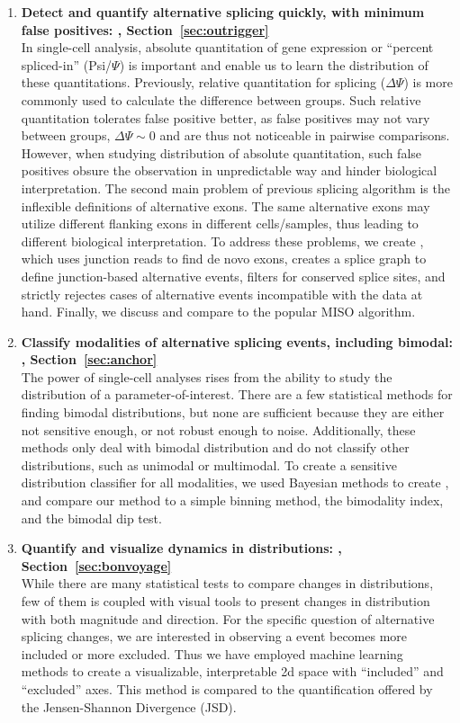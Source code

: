 \begin{enumerate}
	\item \textbf{Detect and quantify alternative splicing quickly, with minimum false positives: \outrigger, Section~\ref{sec:outrigger}}\\
	In single-cell analysis, absolute quantitation of gene expression or ``percent spliced-in'' (Psi/$\Psi$) is important and enable us to learn the distribution of these quantitations. Previously, relative quantitation for splicing ($\Delta\Psi$) is more commonly used to calculate the difference between groups. Such relative quantitation tolerates false positive better, as false positives may not vary between groups, $\Delta\Psi \sim 0$ and are thus not noticeable in pairwise comparisons. However, when studying distribution of absolute quantitation, such false positives obsure the observation in unpredictable way and hinder biological interpretation. The second main problem of previous splicing algorithm is the inflexible definitions of alternative exons. The same alternative exons may utilize different flanking exons in different cells/samples, thus leading to different biological interpretation. To address these problems, we create \outrigger, which uses junction reads to find de novo exons, creates a splice graph to define junction-based alternative events, filters for conserved splice sites, and strictly rejectes cases of alternative events incompatible with the data at hand. Finally, we discuss and compare to the popular MISO\cite{Katz:2010iv} algorithm.
	\item \textbf{Classify modalities of alternative splicing events, including bimodal: \anchor, Section~\ref{sec:anchor}}\\
	The power of single-cell analyses rises from the ability to study the distribution of a parameter-of-interest. There are a few statistical methods for finding bimodal distributions, but none are sufficient because they are either not sensitive enough, or not robust enough to noise. Additionally, these methods only deal with bimodal distribution and do not classify other distributions, such as unimodal or multimodal. To create a sensitive distribution classifier for all modalities, we used Bayesian methods to create \anchor, and compare our method to a simple binning method, the bimodality index\cite{Wang:2009wm}, and the bimodal dip test\cite{Hartigan:1985ca}.
	\item \textbf{Quantify and visualize dynamics in distributions: \bonvoyage, Section~\ref{sec:bonvoyage}}\\
	While there are many statistical tests to compare changes in distributions, few of them is coupled with visual tools to present changes in distribution with both magnitude and direction. For the specific question of alternative splicing changes, we are interested in observing a event becomes more included or more excluded. Thus we have employed machine learning methods to create a visualizable, interpretable 2d space with ``included'' and ``excluded'' axes. This method is compared to the quantification offered by the Jensen-Shannon Divergence (JSD)\cite{Anonymous:2011vn}.
\end{enumerate}

